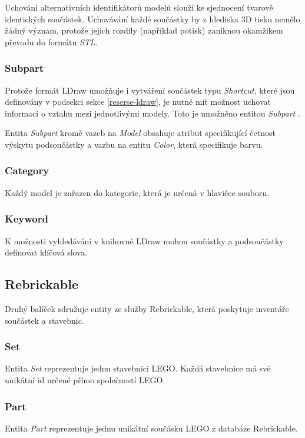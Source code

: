 Uchování alternativních identifikátorů modelů slouží ke sjednocení tvarově identických součástek. Uchovávání každé součástky by z hlediska 3D tisku nemělo žádný význam, protože jejich rozdíly (například potisk) zaniknou okamžikem převodu do formátu \textit{STL}.

\subsubsection*{Subpart}
Protože formát LDraw umožňuje i vytváření součástek typu \textit{Shortcut}, které jsou definovány v podsekci  sekce \ref{reserse-ldraw}, je nutné mít možnost uchovat informaci o vztahu mezi jednotlivými modely. Toto je umožněno entitou \textit{Subpart} . 

Entita \textit{Subpart} kromě vazeb na \textit{Model} obsahuje atribut specifikující četnost výskytu podsoučástky a vazbu na entitu \textit{Color}, která specifikuje barvu. 

\subsubsection*{Category}
Každý model je zařazen do kategorie, která je určená v hlavičce souboru.

\subsubsection*{Keyword}
K možnosti vyhledávání v knihovně LDraw mohou součástky a podsoučástky definovat klíčová slova.

\subsection{Rebrickable}
Druhý balíček sdružuje entity ze služby Rebrickable, která poskytuje inventáře součástek a stavebnic.

\subsubsection*{Set}
Entita \textit{Set} reprezentuje jednu stavebnici LEGO. Každá stavebnice má své unikátní id určené přímo společností LEGO. 

\subsubsection*{Part}
Entita \textit{Part} reprezentuje jednu unikátní součásku LEGO z databáze Rebrickable.

